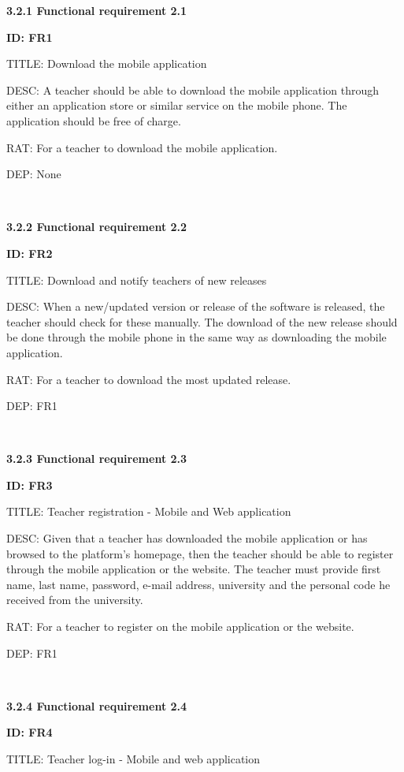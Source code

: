 \documentclass[12pt,a4paper]{article}
\begin{document}
\begin{flushleft}
        \textbf{3.2.1 Functional requirement 2.1}

        \textbf{ID: FR1}

        TITLE: Download the mobile application

        DESC: A teacher should be able to download the mobile application
        through either an application store or similar service on the mobile
        phone. The application should be free of charge.

        RAT: For a teacher to download the mobile application.

        DEP: None

        \

        \textbf{3.2.2 Functional requirement 2.2}

        \textbf{ID: FR2}

        TITLE: Download and notify teachers of new releases

        DESC: When a new/updated version or release of the software is released,
        the teacher should check for these manually. The download of the new
        release should be done through the mobile phone in the same way as
        downloading the mobile application.

        RAT: For a teacher to download the most updated release.

        DEP: FR1

        \

        \textbf{3.2.3 Functional requirement 2.3}

        \textbf{ID: FR3}

        TITLE: Teacher registration - Mobile and Web application

        DESC: Given that a teacher has downloaded the mobile application or has
        browsed to the platform's homepage, then the teacher should be able to
        register through the mobile application or the website. The teacher must
        provide first name, last name, password, e-mail address, university and
        the personal code he received from the university.

        RAT: For a teacher to register on the mobile application or the website.

        DEP: FR1

        \

        \textbf{3.2.4 Functional requirement 2.4}

        \textbf{ID: FR4}

        TITLE: Teacher log-in - Mobile and web application


\end{flushleft}
\end{document}
